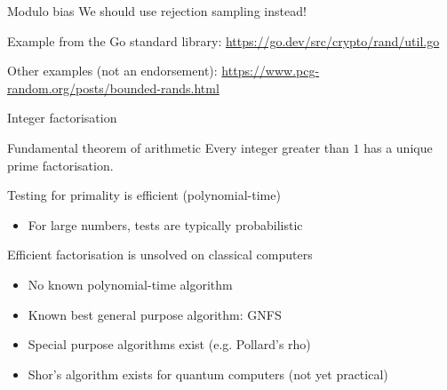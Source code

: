 \begin{frame}{Modulo bias}
  \pause
  We should use \alert{rejection sampling} instead!

  \vspace*{1em}

  \pause
  Example from the Go standard library:
  \url{https://go.dev/src/crypto/rand/util.go}

  \vspace*{1em}

  \pause
  Other examples (not an endorsement):
  \url{https://www.pcg-random.org/posts/bounded-rands.html}
\end{frame}

\begin{frame}{Integer factorisation}
  \pause
  \begin{block}{Fundamental theorem of arithmetic}
    Every integer greater than $1$ has a unique prime factorisation.
  \end{block}

  \pause
  Testing for primality is efficient (polynomial-time)
  \pause
  \begin{itemize}
    \item For large numbers, tests are typically probabilistic
  \end{itemize}
  
  \pause
  Efficient factorisation is unsolved on classical computers
  \begin{itemize}[<+(1)->]
    \item No known polynomial-time algorithm
    \item Known best general purpose algorithm: GNFS
    \item Special purpose algorithms exist (e.g. Pollard's rho)
    \item Shor's algorithm exists for quantum computers (not yet practical)
  \end{itemize}
\end{frame}

